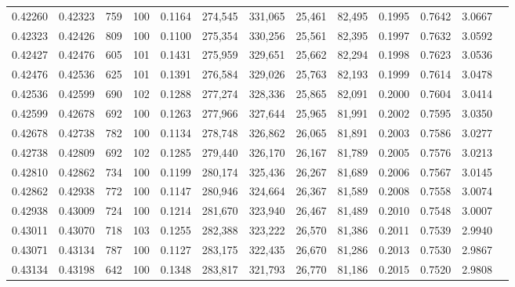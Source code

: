 \begin{tabular}{rrrrrrrrrrrrr}
0.42260 & 0.42323 &   759 & 100 &                                     0.1164 & 274,545 & 331,065 &  25,461 &  82,495 & 0.1995 & 0.7642 & 3.0667 \\
0.42323 & 0.42426 &   809 & 100 &                                     0.1100 & 275,354 & 330,256 &  25,561 &  82,395 & 0.1997 & 0.7632 & 3.0592 \\
0.42427 & 0.42476 &   605 & 101 &                                     0.1431 & 275,959 & 329,651 &  25,662 &  82,294 & 0.1998 & 0.7623 & 3.0536 \\
0.42476 & 0.42536 &   625 & 101 &                                     0.1391 & 276,584 & 329,026 &  25,763 &  82,193 & 0.1999 & 0.7614 & 3.0478 \\
0.42536 & 0.42599 &   690 & 102 &                                     0.1288 & 277,274 & 328,336 &  25,865 &  82,091 & 0.2000 & 0.7604 & 3.0414 \\
0.42599 & 0.42678 &   692 & 100 &                                     0.1263 & 277,966 & 327,644 &  25,965 &  81,991 & 0.2002 & 0.7595 & 3.0350 \\
0.42678 & 0.42738 &   782 & 100 &                                     0.1134 & 278,748 & 326,862 &  26,065 &  81,891 & 0.2003 & 0.7586 & 3.0277 \\
0.42738 & 0.42809 &   692 & 102 &                                     0.1285 & 279,440 & 326,170 &  26,167 &  81,789 & 0.2005 & 0.7576 & 3.0213 \\
0.42810 & 0.42862 &   734 & 100 &                                     0.1199 & 280,174 & 325,436 &  26,267 &  81,689 & 0.2006 & 0.7567 & 3.0145 \\
0.42862 & 0.42938 &   772 & 100 &                                     0.1147 & 280,946 & 324,664 &  26,367 &  81,589 & 0.2008 & 0.7558 & 3.0074 \\
0.42938 & 0.43009 &   724 & 100 &                                     0.1214 & 281,670 & 323,940 &  26,467 &  81,489 & 0.2010 & 0.7548 & 3.0007 \\
0.43011 & 0.43070 &   718 & 103 &                                     0.1255 & 282,388 & 323,222 &  26,570 &  81,386 & 0.2011 & 0.7539 & 2.9940 \\
0.43071 & 0.43134 &   787 & 100 &                                     0.1127 & 283,175 & 322,435 &  26,670 &  81,286 & 0.2013 & 0.7530 & 2.9867 \\
0.43134 & 0.43198 &   642 & 100 &                                     0.1348 & 283,817 & 321,793 &  26,770 &  81,186 & 0.2015 & 0.7520 & 2.9808 \\

\end{tabular}
